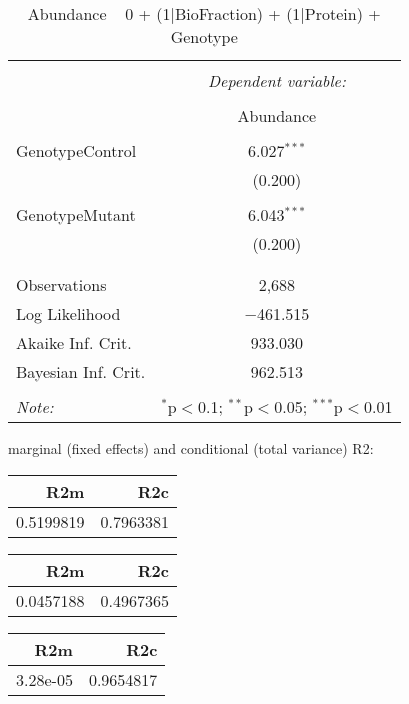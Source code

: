 \documentclass[11pt]{report}
\begin{document}
\begin{table}[!htbp] \centering 
  \caption{Abundance ~ 0 + (1|BioFraction) + (1|Protein) + Genotype} 
  \label{} 
\begin{tabular}{@{\extracolsep{5pt}}lc} 
\\[-1.8ex]\hline 
\hline \\[-1.8ex] 
 & \multicolumn{1}{c}{\textit{Dependent variable:}} \\ 
\cline{2-2} 
\\[-1.8ex] & Abundance \\ 
\hline \\[-1.8ex] 
 GenotypeControl & 6.027$^{***}$ \\ 
  & (0.200) \\ 
  & \\ 
 GenotypeMutant & 6.043$^{***}$ \\ 
  & (0.200) \\ 
  & \\ 
\hline \\[-1.8ex] 
Observations & 2,688 \\ 
Log Likelihood & $-$461.515 \\ 
Akaike Inf. Crit. & 933.030 \\ 
Bayesian Inf. Crit. & 962.513 \\ 
\hline 
\hline \\[-1.8ex] 
\textit{Note:}  & \multicolumn{1}{r}{$^{*}$p$<$0.1; $^{**}$p$<$0.05; $^{***}$p$<$0.01} \\ 
\end{tabular} 
\end{table} 
marginal (fixed effects) and conditional (total variance) R2:

\begin{tabular}{r|r}
\hline
R2m & R2c\\
\hline
0.5199819 & 0.7963381\\
\hline
\end{tabular}

\begin{tabular}{r|r}
\hline
R2m & R2c\\
\hline
0.0457188 & 0.4967365\\
\hline
\end{tabular}

\begin{tabular}{r|r}
\hline
R2m & R2c\\
\hline
3.28e-05 & 0.9654817\\
\hline
\end{tabular}
\end{document}
